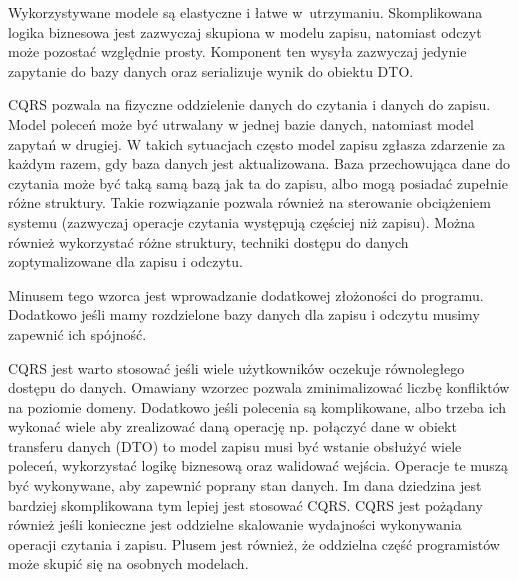 Wykorzystywane modele są elastyczne i łatwe w~utrzymaniu. Skomplikowana logika biznesowa jest zazwyczaj skupiona w modelu zapisu, natomiast odczyt może pozostać względnie prosty. Komponent ten wysyła zazwyczaj jedynie zapytanie do bazy danych oraz serializuje wynik do obiektu DTO. 

CQRS pozwala na fizyczne oddzielenie danych do czytania i danych do zapisu. Model poleceń może być utrwalany w jednej bazie danych, natomiast model zapytań w drugiej.  W takich sytuacjach często model zapisu zgłasza zdarzenie za każdym razem, gdy baza danych jest aktualizowana. Baza przechowująca dane do czytania może być taką samą bazą jak ta do zapisu, albo mogą posiadać zupełnie różne struktury. Takie rozwiązanie pozwala również na sterowanie obciążeniem systemu (zazwyczaj operacje czytania występują częściej niż zapisu). Można również wykorzystać różne struktury, techniki dostępu do danych zoptymalizowane dla zapisu i odczytu. 


Minusem tego wzorca jest wprowadzanie dodatkowej złożoności do programu. Dodatkowo jeśli mamy rozdzielone bazy danych dla zapisu i odczytu musimy zapewnić ich spójność.

CQRS jest warto stosować jeśli wiele użytkowników oczekuje równoległego dostępu do danych. Omawiany wzorzec pozwala zminimalizować liczbę konfliktów na poziomie domeny. Dodatkowo jeśli polecenia są komplikowane, albo trzeba ich wykonać wiele aby zrealizować daną operację np. połączyć dane w obiekt transferu danych (DTO) to model zapisu musi być wstanie obsłużyć wiele poleceń, wykorzystać logikę biznesową oraz walidować wejścia. Operacje te muszą być wykonywane, aby zapewnić poprany stan danych. Im dana dziedzina jest bardziej skomplikowana tym lepiej jest stosować CQRS. CQRS jest pożądany również jeśli konieczne jest oddzielne skalowanie wydajności wykonywania operacji czytania i zapisu. Plusem jest również, że oddzielna część programistów może skupić się na osobnych modelach.



